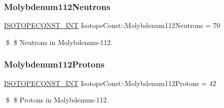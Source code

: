 \subsubsection{\texorpdfstring{Molybdenum112\+Neutrons}{Molybdenum112Neutrons}}
{\footnotesize\ttfamily \mbox{\hyperlink{group___isotope_const-_macros_ga5f18360b3e99483a35c32d789e62621c}{I\+S\+O\+T\+O\+P\+E\+C\+O\+N\+S\+T\+\_\+\+I\+NT}} Isotope\+Const\+::\+Molybdenum112\+Neutrons = 70}

\$ \$ Neutrons in Molybdenum-\/112. \mbox{\label{group___isotope_const-_molybdenum-_mo112_ga8cf0a2b3b7c958939ceaef2fd0da1404}} 
\subsubsection{\texorpdfstring{Molybdenum112\+Protons}{Molybdenum112Protons}}
{\footnotesize\ttfamily \mbox{\hyperlink{group___isotope_const-_macros_ga5f18360b3e99483a35c32d789e62621c}{I\+S\+O\+T\+O\+P\+E\+C\+O\+N\+S\+T\+\_\+\+I\+NT}} Isotope\+Const\+::\+Molybdenum112\+Protons = 42}

\$ \$ Protons in Molybdenum-\/112. 
